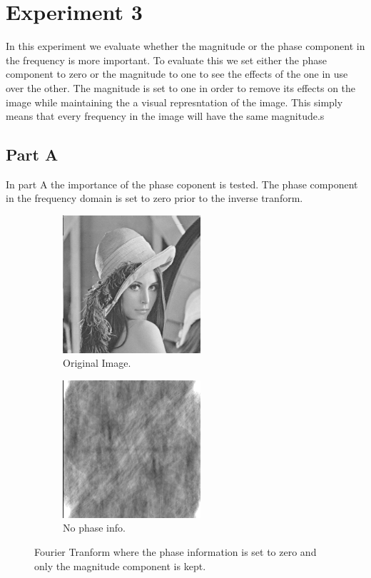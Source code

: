 \documentclass[letter]{article}
\begin{document}
\section{Experiment 3}
In this experiment we evaluate whether the magnitude or the phase component in the frequency is more important. To evaluate this we set either the phase component to zero or the magnitude to one to see the effects of the one in use over the other. The magnitude is set to one in order to remove its effects on the image while maintaining the a visual represntation of the image. This simply means that every frequency in the image will have the same magnitude.s
\subsection{Part A}
In part A the importance of the phase coponent is tested. The phase component in the frequency domain is set to zero prior to the inverse tranform.
\begin{figure}[hbtp]
  \centering
  \begin{subfigure}{5.1cm}
    \includegraphics[width=5.1cm]{images/lenna.png}
    \caption{Original Image.}
  \end{subfigure}
  \begin{subfigure}{5.1cm}
    \includegraphics[width=5.1cm]{images/lenna_mag_only.png}
    \caption{No phase info.}
  \end{subfigure}
  \caption{Fourier Tranform where the phase information is set to zero and only the magnitude component is kept.}
  \label{fig:ft_mag}
\end{figure}
\end{document}

